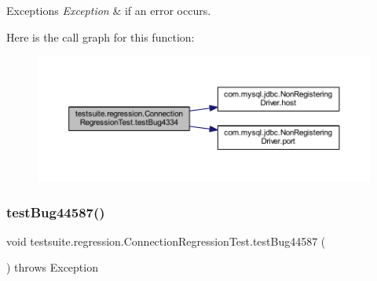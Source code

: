 \begin{DoxyExceptions}{Exceptions}
{\em Exception} & if an error occurs. \\
\hline
\end{DoxyExceptions}
Here is the call graph for this function\+:
\nopagebreak
\begin{figure}[H]
\begin{center}
\leavevmode
\includegraphics[width=350pt]{classtestsuite_1_1regression_1_1_connection_regression_test_a83abae1bb52b0bab9efe6949e40faecf_cgraph}
\end{center}
\end{figure}
\mbox{\label{classtestsuite_1_1regression_1_1_connection_regression_test_af33f3215b2db8a83a5b3bb4079964dd3}} 
\subsubsection{\texorpdfstring{test\+Bug44587()}{testBug44587()}}
{\footnotesize\ttfamily void testsuite.\+regression.\+Connection\+Regression\+Test.\+test\+Bug44587 (\begin{DoxyParamCaption}{ }\end{DoxyParamCaption}) throws Exception}


